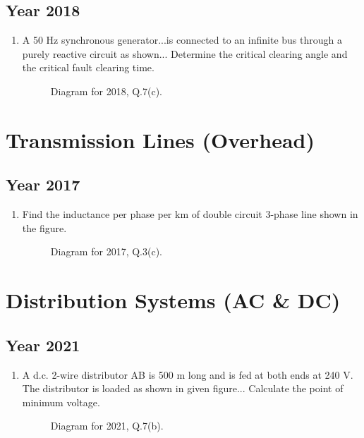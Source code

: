 \documentclass[12pt, a4paper]{article}
\begin{document}
	\subsection{Year 2018}
	\begin{enumerate}[label=\textbf{Q.7(c)}, wide, labelindent=0pt]
		\item A 50 Hz synchronous generator...is connected to an infinite bus through a purely reactive circuit as shown... Determine the critical clearing angle and the critical fault clearing time.
		\begin{figure}[h!]
			\centering
			\caption{Diagram for 2018, Q.7(c).}
		\end{figure}
	\end{enumerate}
	
	\section{Transmission Lines (Overhead)}
	
	\subsection{Year 2017}
	\begin{enumerate}[label=\textbf{Q.3(c)}, wide, labelindent=0pt]
		\item Find the inductance per phase per km of double circuit 3-phase line shown in the figure.
		\begin{figure}[h!]
			\centering
			\caption{Diagram for 2017, Q.3(c).}
		\end{figure}
	\end{enumerate}
	
	\section{Distribution Systems (AC \& DC)}
	\subsection{Year 2021}
	\begin{enumerate}[label=\textbf{Q.7(b)}, wide, labelindent=0pt]
		\item A d.c. 2-wire distributor AB is 500 m long and is fed at both ends at 240 V. The distributor is loaded as shown in given figure... Calculate the point of minimum voltage.
		\begin{figure}[h!]
			\centering
			\caption{Diagram for 2021, Q.7(b).}
		\end{figure}
	\end{enumerate}
	
\end{document}
